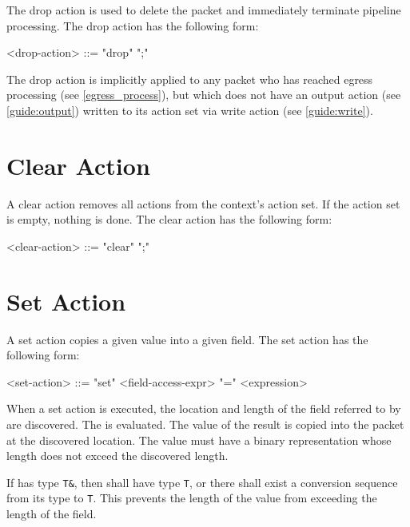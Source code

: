 The drop action is used to delete the packet and immediately terminate pipeline processing. The drop action has the following form:

\begin{minip}
\begin{grammar}
<drop-action> ::= "drop" ";"
\end{grammar}
\end{minip}

The drop action is implicitly applied to any packet who has reached egress processing (see \ref{egress_process}), but which does not have an output action (see \ref{guide:output}) written to its action set via write action (see \ref{guide:write}).

\section{Clear Action} \label{guide:clear}

A clear action removes all actions from the context's action set. If the action set is empty, nothing is done. The clear action has the following form:

\begin{minip}
\begin{grammar}
<clear-action> ::= "clear" ";"
\end{grammar}
\end{minip}

\section{Set Action} \label{guide:set_field}

A set action copies a given value into a given field. The set action has the following form:

\begin{minip}
\begin{grammar}
<set-action> ::= "set" <field-access-expr> "=" <expression>
\end{grammar}
\end{minip}

When a set action is executed, the location and length of the field referred to by  are discovered. The  is evaluated. The value of the result is copied into the packet at the discovered location. The value must have a binary representation whose length does not exceed the discovered length. 

If  has type \texttt{T\&}, then  shall have type \texttt{T}, or there shall exist a conversion sequence from its type to \texttt{T}. This prevents the length of the value from exceeding the length of the field.

